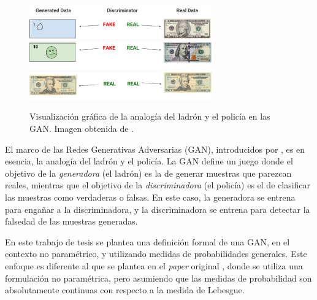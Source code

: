 {{\begin{figure}[htbp]
    \centering
    \includegraphics[width=0.7\textwidth]{img/gan/bad_gan.pdf}\vspace{0.6cm}
    \includegraphics[width=0.7\textwidth]{img/gan/ok_gan.pdf}
    \includegraphics[width=0.7\textwidth]{img/gan/good_gan.pdf}
    \caption{Visualización gráfica de la analogía del ladrón y el policía en las GAN. Imagen obtenida de \cite{googlegan}.}
    \label{fig:gan-analogy}
\end{figure}

El marco de las Redes Generativas Adversarias (GAN), introducidos por \cite{goodfellow2014generative}, es en esencia, la analogía del ladrón y el policía.
La GAN define un juego donde el objetivo de la \emph{generadora} (el ladrón) es la de generar muestras que parezcan reales, mientras que el objetivo de la \emph{discriminadora} (el policía) es el de clasificar las muestras como verdaderas o falsas.
En este caso, la generadora se entrena para engañar a la discriminadora, y la discriminadora se entrena para detectar la falsedad de las muestras generadas.

En este trabajo de tesis se plantea una definición formal de una GAN, en el contexto no paramétrico, y utilizando medidas de probabilidades generales. Este enfoque es diferente al que se plantea en el \textit{paper} original \cite{goodfellow2014generative}, donde se utiliza una formulación no paramétrica, pero asumiendo que las medidas de probabilidad son absolutamente continuas con respecto a la medida de Lebesgue.

}}
